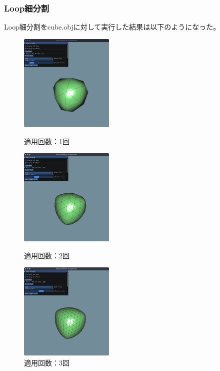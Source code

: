 \documentclass[a4paper,10pt,uplatex,dvipdfmx]{jsarticle}
\begin{document}
\subsubsection{Loop細分割}
Loop細分割をcube.objに対して実行した結果は以下のようになった。
\begin{figure}[htbp]
  \begin{minipage}{0.33\hsize}
    \begin{center}
      \includegraphics[width=45mm]{img/loop-cube-1.png}
      \caption{適用回数：1回}
    \end{center}
  \end{minipage}
  \begin{minipage}{0.33\hsize}
    \begin{center}
      \includegraphics[width=45mm]{img/loop-cube-2.png}
      \caption{適用回数：2回}
    \end{center}
  \end{minipage}
  \begin{minipage}{0.33\hsize}
    \begin{center}
      \includegraphics[width=45mm]{img/loop-cube-3.png}
      \caption{適用回数：3回}
    \end{center}
  \end{minipage}
\end{figure}
\end{document}
